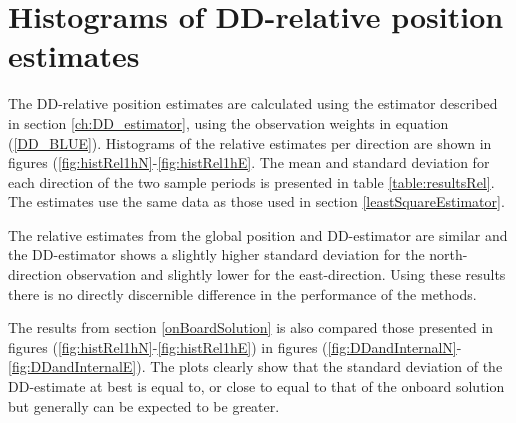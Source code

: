 \section{Histograms of DD-relative position estimates}\label{histogramDD}
The DD-relative position estimates are calculated using the estimator described in section \ref{ch:DD_estimator}, using the observation weights in equation (\ref{DD_BLUE}). Histograms of the relative estimates per direction are shown in figures (\ref{fig:histRel1hN}-\ref{fig:histRel1hE}. The mean and standard deviation for each direction of the two sample periods is presented in table \ref{table:resultsRel}. The estimates use the same data as those used in section \ref{leastSquareEstimator}. 
\par
The relative estimates from the global position and DD-estimator are similar and the DD-estimator shows a slightly higher standard deviation for the north-direction observation and slightly lower for the east-direction. Using these results there is no directly discernible difference in the performance of the methods.
\par
The results from section \ref{onBoardSolution} is also compared those presented in figures (\ref{fig:histRel1hN}-\ref{fig:histRel1hE}) in figures (\ref{fig:DDandInternalN}-\ref{fig:DDandInternalE}). The plots clearly show that the standard deviation of the DD-estimate at best is equal to, or close to equal to that of the onboard solution but generally can be expected to be greater.

